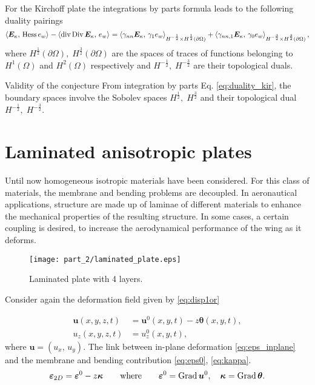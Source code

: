 \begin{remark}\label{rmk:duality_kir}
	For the Kirchoff plate the integrations by parts formula leads to the following duality pairings \cite[Theorem 2.2]{amara2002kir}
	\begin{equation}\label{eq:duality_kir}
	\inner{\bm{E}_\kappa}{\Hess e_w} -\inner{\div\Div\bm{E}_\kappa}{e_w} = \inner[H^{-\frac{1}{2}} \times H^{\frac{1}{2}}(\partial\Omega)]{\gamma_{nn}\bm{E}_\kappa}{\gamma_{1} e_w} + \inner[H^{-\frac{3}{2}} \times H^{\frac{3}{2}}(\partial\Omega)]{\gamma_{nn, 1}\bm{E}_\kappa}{\gamma_{0} e_w},
	\end{equation}
	where $H^{\frac{1}{2}}(\partial\Omega), \; H^{\frac{3}{2}}(\partial\Omega)$ are the spaces of traces of functions belonging to $H^1(\Omega)$ and $H^2(\Omega)$ respectively and $H^{-\frac{1}{2}}, \; H^{-\frac{3}{2}}$ are their topological duals.
\end{remark}

\begin{paragraph}{Validity of the conjecture}
	From integration by parts Eq. \eqref{eq:duality_kir}, the boundary spaces involve the Sobolev spaces $H^{\frac{1}{2}}, \; H^{\frac{3}{2}}$ and their topological dual $H^{-\frac{1}{2}}, \; H^{-\frac{3}{2}}$.
\end{paragraph}

\section{Laminated anisotropic plates}\label{sec:lamAnis}


Until now homogeneous isotropic materials have been considered. For this class of materials, the membrane and bending problems are decoupled. In aeronautical applications, structure are made up of laminae of different materials to enhance the mechanical properties of the resulting structure. In some cases, a certain coupling is desired, to increase the aerodynamical performance of the wing as it deforms.

\begin{figure}[tb]
	\centering
	\texttt{[image: part\_2/laminated\_plate.eps]}
	\caption{Laminated plate with 4 layers.}
	\label{fig:laminated_plate}
\end{figure}

Consider again the deformation field given by \eqref{eq:disp1or}

\begin{equation*}\label{eq:dis1or_2}
\begin{aligned}
\bm{u}(x,y,z,t) &= \bm{u}^0(x,y,t) -z \bm{\theta}(x,y,t), \\
u_z(x,y,z,t) &= u_z^0(x,y,t), 
\end{aligned}
\end{equation*}
where $\bm{u} = (u_x, \, u_y)$. The link between in-plane deformation \eqref{eq:eps_inplane} and the membrane and bending contribution \eqref{eq:eps0}, \eqref{eq:kappa}.
\begin{equation}
\bm{\varepsilon}_{2D} = \bm{\varepsilon}^0 - z \bm{\kappa} \where \bm{\varepsilon}^0=\Grad \bm{u}^0, \quad \bm{\kappa} = \Grad \bm{\theta}.
\end{equation}

